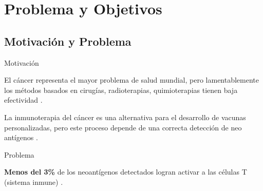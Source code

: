 \documentclass[10pt]{beamer}
\newcommand{\1}{
	\setbeamertemplate{background}{
		\texttt{[image: img/1]}
		\tikz[overlay] \fill[fill opacity=0.75,fill=white] (0,0) rectangle (-\paperwidth,\paperheight);
	}
}
\begin{document}
\section{Problema y Objetivos}

\subsection{Motivación y Problema}

\begin{frame}{Motivación}{}	

\begin{block}{}
	El cáncer representa el mayor problema de salud mundial, pero lamentablemente los métodos basados en cirugías, radioterapias, quimioterapias tienen baja efectividad \cite{peng2019neoantigen}.
\end{block}	

\begin{block}{}
	La inmunoterapia del cáncer es una alternativa para el desarrollo de vacunas personalizadas, pero este proceso depende de una correcta detección de neo antígenos \cite{de2020neoantigen, peng2019neoantigen}.
\end{block}

\end{frame}



\begin{frame}{Problema}{}
	
\begin{block}{}
	\textbf{Menos del 3\%} de los neoantígenos detectados logran activar a las células T (sistema inmune) \cite{de2020neoantigen}. 
\end{block}
	
\end{frame}
\end{document}
